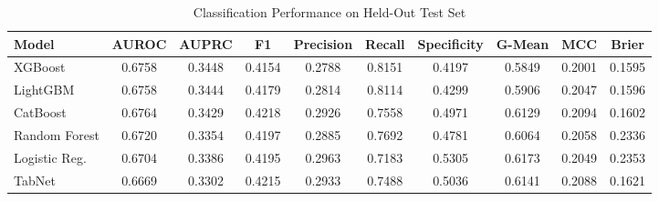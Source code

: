 \begin{table}
\centering
\caption{Classification Performance on Held-Out Test Set}
\label{tab:results}
\begin{tabular}{lccccccccc}
\toprule
Model & AUROC & AUPRC & F1 & Precision & Recall & Specificity & G-Mean & MCC & Brier \\
\midrule
XGBoost & 0.6758 & 0.3448 & 0.4154 & 0.2788 & 0.8151 & 0.4197 & 0.5849 & 0.2001 & 0.1595 \\
LightGBM & 0.6758 & 0.3444 & 0.4179 & 0.2814 & 0.8114 & 0.4299 & 0.5906 & 0.2047 & 0.1596 \\
CatBoost & 0.6764 & 0.3429 & 0.4218 & 0.2926 & 0.7558 & 0.4971 & 0.6129 & 0.2094 & 0.1602 \\
Random Forest & 0.6720 & 0.3354 & 0.4197 & 0.2885 & 0.7692 & 0.4781 & 0.6064 & 0.2058 & 0.2336 \\
Logistic Reg. & 0.6704 & 0.3386 & 0.4195 & 0.2963 & 0.7183 & 0.5305 & 0.6173 & 0.2049 & 0.2353 \\
TabNet & 0.6669 & 0.3302 & 0.4215 & 0.2933 & 0.7488 & 0.5036 & 0.6141 & 0.2088 & 0.1621 \\
\bottomrule
\end{tabular}
\end{table}
